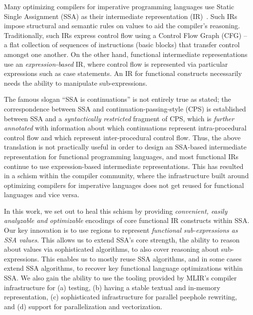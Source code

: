 \documentclass[conference]{IEEEtran}
\begin{document}
Many optimizing compilers for imperative programming languages use Static Single Assignment (SSA) as their
intermediate representation (IR)~\cite{lattner2004llvm}\cite{Novillo2004DesignAI}. Such IRs impose structural and semantic rules on values to aid
the compiler's reasoning. Traditionally, such IRs express control flow using a Control Flow Graph (CFG) -- a flat collection of sequences of instructions (basic blocks) that
transfer control amongst one another. On the other hand, functional intermediate representations
use an \emph{expression-based} IR, where control flow is represented via particular expressions such as
case statements. An IR for functional constructs necessarily needs the ability to manipulate
sub-expressions.

The famous slogan ``SSA is continuations'' \cite{kelsey1995correspondence} is not entirely true as stated; the correspondence
between SSA and continuation-passing-style (CPS) is established between SSA and a
\emph{syntactically restricted} fragment of CPS, which is \emph{further annotated} with information
about which continuations represent intra-procedural control flow and which represent
inter-procedural control flow. Thus, the above translation is not practically useful in order
to design an SSA-based intermediate representation for functional programming languages, and
most functional IRs continue to use expression-based intermediate representations.
This has resulted in a schism within the compiler community, where the infrastructure built around
optimizing compilers for imperative languages does not get reused for functional languages
and vice versa.


In this work, we set out to heal this schism by providing \emph{convenient, easily analyzable and
optimizable} encodings of core functional IR constructs within SSA. Our key innovation is
to use regions to represent \emph{functional sub-expressions as SSA values}.
This allows us to extend SSA's core strength, the ability to reason about values via
sophisticated algorithms, to also cover reasoning about sub-expressions.
This enables us to mostly reuse SSA algorithms,
and in some cases extend SSA algorithms, to recover key functional
language optimizations within SSA. We also gain the ability to use the tooling
provided by MLIR's compiler infrastructure for (a) testing, (b) having a stable textual
and in-memory representation, (c) sophisticated
infrastructure for parallel peephole rewriting, and (d) support for parallelization and vectorization.
\end{document}
